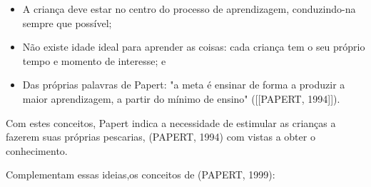 \begin{itemize}
\item A criança deve estar no centro do processo de aprendizagem, conduzindo-na sempre que possível;
\item Não existe idade ideal para aprender as coisas: cada criança tem o seu próprio tempo e momento de interesse; e
\item Das próprias palavras de Papert: "a meta é ensinar de forma a produzir a maior aprendizagem, a partir do mínimo de ensino"  ([[PAPERT, 1994]]).
\end{itemize}

Com estes conceitos, Papert indica a necessidade de estimular as crianças a fazerem suas próprias pescarias,  (PAPERT, 1994) com vistas a obter o conhecimento.

Complementam essas ideias,os conceitos de (PAPERT, 1999):


